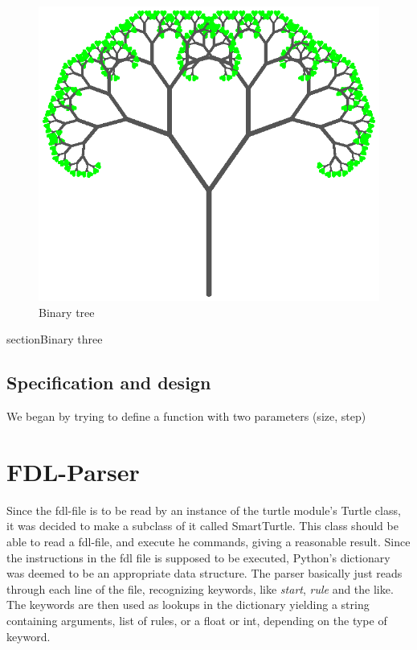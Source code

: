 \documentclass[titlepage]{article}
\begin{document}
\begin{figure}[H]
  \centering
  \includegraphics{bintree}
  \caption{Binary tree}
\end{figure}
section{Binary three}
\subsection{Specification and design}
We began by trying to define a function with two parameters (size, step)
\section{FDL-Parser}
Since the fdl-file is to be read by an instance of the turtle module's Turtle class, it was decided to make a subclass of it called SmartTurtle. This class should be able to read a fdl-file, and execute he commands, giving a reasonable result. 
Since the instructions in the fdl file is supposed to be executed, Python's dictionary was deemed to be an appropriate data structure. The parser basically just reads through each line of the file, recognizing keywords, like \textit{start}, \textit{rule} and the like. The keywords are then used as lookups in the dictionary yielding a string containing arguments, list of rules, or a float or int, depending on the type of keyword.  \par
\end{document}
